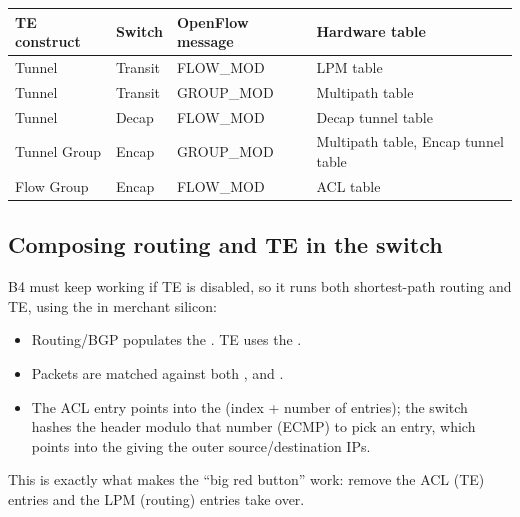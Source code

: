 \begin{center}
\begin{tabular}{@{}llll@{}}
\toprule
\textbf{TE construct} & \textbf{Switch} & \textbf{OpenFlow message} & \textbf{Hardware table} \\
\midrule
Tunnel & Transit & FLOW\_MOD & LPM table \\
Tunnel & Transit & GROUP\_MOD & Multipath table \\
Tunnel & Decap & FLOW\_MOD & Decap tunnel table \\
Tunnel Group & Encap & GROUP\_MOD & Multipath table, Encap tunnel table \\
Flow Group & Encap & FLOW\_MOD & ACL table \\
\bottomrule
\end{tabular}
\end{center}


\subsection{Composing routing and TE in the switch}
B4 must keep working if TE is disabled, so it runs both shortest-path routing and TE, using the  in merchant silicon:
\begin{itemize}
\item Routing/BGP populates the . TE uses the .
\item Packets are matched against both , and .
\item The ACL entry points into the  (index + number of entries); the switch hashes the header modulo that number (ECMP) to pick an entry, which points into the  giving the outer source/destination IPs.
\end{itemize}
This is exactly what makes the ``big red button'' work: remove the ACL (TE) entries and the LPM (routing) entries take over.

